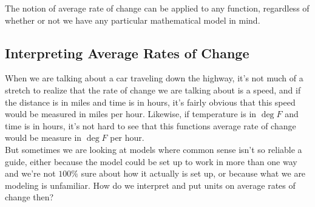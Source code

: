 \bigskip

The notion of average rate of change can be applied to any function, regardless of whether or not we have any particular mathematical model in mind.



%
%

\subsection{Interpreting Average Rates of Change}

When we are talking about a car traveling down the highway, it’s not much of a stretch to realize that the rate of change we are talking about is a speed, and if the distance is in miles and time is in hours, it’s fairly obvious that this speed would be measured in miles per hour. Likewise, if temperature is in $\deg F$ and time is in hours, it’s not hard to see that this functions average rate of change would be measure in $\deg F$ per hour.\\

But sometimes we are looking at models where common sense isn’t so reliable a guide, either because the model could be set up to work in more than one way and we’re not $100\%$ sure about how it actually is set up, or because what we are modeling is unfamiliar. How do we interpret and put units on average rates of change then?\\

